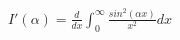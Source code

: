 \documentclass[preview]{standalone}
\begin{document}
\begin{align*}
I'(\alpha) = \frac{d}{dx}\int_{0}^{\infty}\frac{sin^2(\alpha x)}{x^2}dx
\end{align*}
\end{document}

